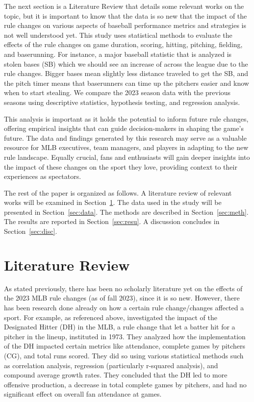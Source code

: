 \documentclass[12pt]{article}
\begin{document}
The next section is a Literature Review that details some relevant works on the
topic, but it is important to know that the data is so new that the impact of the
rule changes on various aspects of baseball performance metrics and strategies 
is not well understood yet. This study uses statistical methods to evaluate the
effects of the rule changes on game duration, scoring, hitting, pitching, fielding,
and baserunning. For instance, a major baseball statistic that is analyzed is
stolen bases (SB) which we should see an increase of across the league due to the
rule changes. Bigger bases mean slightly less distance traveled to get the
SB, and the pitch timer means that baserunners can time up the pitchers easier
and know when to start stealing. We compare the 2023 season data with the previous
seasons using descriptive statistics, hypothesis testing, and regression analysis.

This analysis is important as it holds the potential to inform future rule changes,
offering empirical insights that can guide decision-makers in shaping the game's
future. The data and findings generated by this research may serve as a valuable
resource for MLB executives, team managers, and players in adapting to the new
rule landscape. Equally crucial, fans and enthusiasts will gain deeper insights
into the impact of these changes on the sport they love, providing context to
their experiences as spectators.

The rest of the paper is organized as follows.
A literature review of relevant works will be examined in Section~\ref{sec:lit}.
The data used in the study will be presented in Section~\ref{sec:data}.
The methods are described in Section~\ref{sec:meth}.
The results are reported in Section~\ref{sec:resu}.
A discussion concludes in Section~\ref{sec:disc}.


\section{Literature Review}
\label{sec:lit}

As stated previously, there has been no scholarly literature yet on the effects
of the 2023 MLB rule changes (as of fall 2023), since it is so new. However,
there has been research done already on how a certain rule change/changes
affected a sport. For example, as referenced above, \citet{Cooley} investigated
the impact of the Designated Hitter (DH) in the MLB, a rule change that let a batter
hit for a pitcher in the lineup, instituted in 1973. They analyzed how the
implementation of the DH impacted certain metrics like attendance, complete games
by pitchers (CG), and total runs scored. They did so using various statistical
methods such as correlation analysis, regression (particularly r-squared analysis),
and compound average growth rates. They concluded that the DH led to more offensive
production, a decrease in total complete games by pitchers, and had no significant
effect on overall fan attendance at games.
\end{document}
